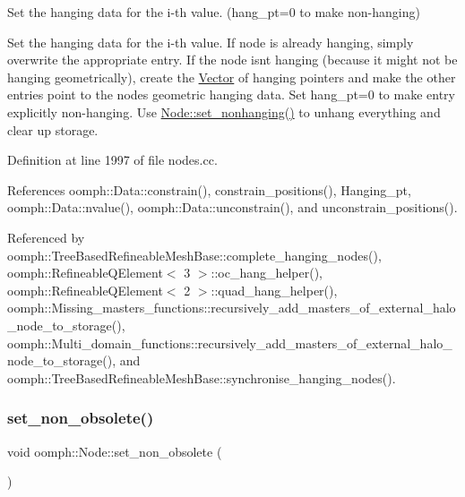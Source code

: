 Set the hanging data for the i-\/th value. (hang\+\_\+pt=0 to make non-\/hanging) 

Set the hanging data for the i-\/th value. If node is already hanging, simply overwrite the appropriate entry. If the node isn\textquotesingle{}t hanging (because it might not be hanging geometrically), create the \hyperlink{classoomph_1_1Vector}{Vector} of hanging pointers and make the other entries point to the node\textquotesingle{}s geometric hanging data. Set hang\+\_\+pt=0 to make entry explicitly non-\/hanging. Use \hyperlink{classoomph_1_1Node_a2517b670b4494f5421f5ec0d92cf8bb0}{Node\+::set\+\_\+nonhanging()} to unhang everything and clear up storage. 

Definition at line 1997 of file nodes.\+cc.



References oomph\+::\+Data\+::constrain(), constrain\+\_\+positions(), Hanging\+\_\+pt, oomph\+::\+Data\+::nvalue(), oomph\+::\+Data\+::unconstrain(), and unconstrain\+\_\+positions().



Referenced by oomph\+::\+Tree\+Based\+Refineable\+Mesh\+Base\+::complete\+\_\+hanging\+\_\+nodes(), oomph\+::\+Refineable\+Q\+Element$<$ 3 $>$\+::oc\+\_\+hang\+\_\+helper(), oomph\+::\+Refineable\+Q\+Element$<$ 2 $>$\+::quad\+\_\+hang\+\_\+helper(), oomph\+::\+Missing\+\_\+masters\+\_\+functions\+::recursively\+\_\+add\+\_\+masters\+\_\+of\+\_\+external\+\_\+halo\+\_\+node\+\_\+to\+\_\+storage(), oomph\+::\+Multi\+\_\+domain\+\_\+functions\+::recursively\+\_\+add\+\_\+masters\+\_\+of\+\_\+external\+\_\+halo\+\_\+node\+\_\+to\+\_\+storage(), and oomph\+::\+Tree\+Based\+Refineable\+Mesh\+Base\+::synchronise\+\_\+hanging\+\_\+nodes().

\mbox{\label{classoomph_1_1Node_a6dfc895be93214f4a880c1e9e7a3b4a6}} 
\subsubsection{\texorpdfstring{set\+\_\+non\+\_\+obsolete()}{set\_non\_obsolete()}}
{\footnotesize\ttfamily void oomph\+::\+Node\+::set\+\_\+non\+\_\+obsolete (\begin{DoxyParamCaption}{ }\end{DoxyParamCaption})\hspace{0.3cm}{\ttfamily [inline]}}



